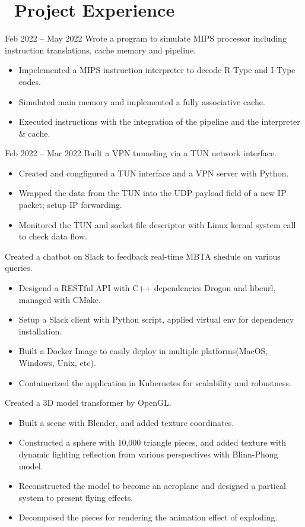 \documentclass{resume}
\begin{document}
\section{\faUsers\ Project Experience}
 {Feb 2022 -- May 2022}
Wrote a program to simulate MIPS processor including instruction translations, cache memory and pipeline.
\begin{itemize}
  \item Impelemented a MIPS instruction interpreter to decode R-Type and I-Type codes.
  \item Simulated main memory and implemented a fully associative cache. 
  \item Executed instructions with the integration of the pipeline and the interpreter \& cache.  
\end{itemize}

 {Feb 2022 -- Mar 2022}
Built a VPN tunneling via a TUN network interface.
\begin{itemize}
  \item Created and congfigured a TUN interface and a VPN server with Python.
  \item Wrapped the data from the TUN into the UDP payload field of a new IP packet; setup IP forwarding.
  \item Monitored the TUN and socket file descriptor with Linux kernal system call to check data flow.
\end{itemize}

Created a chatbot on Slack to feedback real-time MBTA shedule on various queries.
\begin{itemize}
  \item Desigend a RESTful API with C++ dependencies Drogon and libcurl, managed with CMake.
  \item Setup a Slack client with Python script, applied virtual env for dependency installation.  
  \item Built a Docker Image to easily deploy in multiple platforms(MacOS, Windows, Unix, etc).
  \item Containerized the application in Kubernetes for scalability and robustness. 
\end{itemize}

Created a 3D model transformer by OpenGL.
\begin{itemize}
  \item Built a scene with Blender, and added texture coordinates.
  \item Constructed a sphere with 10,000 triangle pieces, and added texture with dynamic lighting reflection from various perspectives with Blinn-Phong model.
  \item Reconstructed the model to become an aeroplane and designed a partical system to present flying effects.
  \item Decomposed the pieces for rendering the animation effect of exploding.  
\end{itemize}
\end{document}

